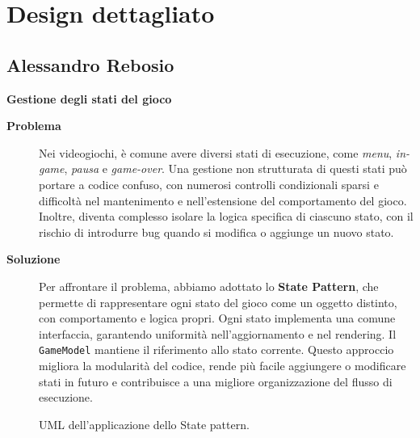 \documentclass[a4paper,12pt]{report}
\begin{document}
\newpage
\section{Design dettagliato}
\subsection{Alessandro Rebosio}
\textbf{Gestione degli stati del gioco}
\begin{description}
	\item[\textbf{Problema}]
	      Nei videogiochi, è comune avere diversi stati di esecuzione, come \textit{menu}, \textit{in-game}, \textit{pausa} e \textit{game-over}. Una gestione non strutturata di questi stati
	      può portare a codice confuso, con numerosi controlli condizionali sparsi e difficoltà nel mantenimento e nell'estensione del comportamento del gioco. Inoltre, diventa complesso isolare
	      la logica specifica di ciascuno stato, con il rischio di introdurre bug quando si modifica o aggiunge un nuovo stato.

	\item[\textbf{Soluzione}]
	      Per affrontare il problema, abbiamo adottato lo \textbf{State Pattern}, che permette di rappresentare ogni stato del gioco come un oggetto distinto, con comportamento e
	      logica propri. Ogni stato implementa una comune interfaccia, garantendo uniformità nell'aggiornamento e nel rendering. Il \texttt{GameModel} mantiene il riferimento allo stato corrente.
	      Questo approccio migliora la modularità del codice, rende più facile aggiungere o modificare stati in futuro e contribuisce a una migliore organizzazione del flusso di esecuzione.
\end{description}
\begin{figure}[H]
	\centering{}
	
	\caption{UML dell'applicazione dello State pattern.}
	\label{img:modelstate}
\end{figure}
\end{document}

